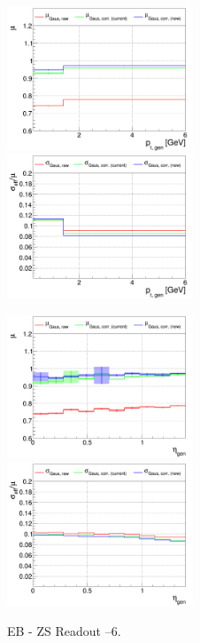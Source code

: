 \begin{figure}
\includegraphics[width=0.495\textwidth]{./plots_pdf/ECAL_plots/plotsNOPU/EB/ZS/pdf/GENPT/EBZS_GENPT_0000_0006_MuOverBins.pdf}
\includegraphics[width=0.495\textwidth]{./plots_pdf/ECAL_plots/plotsNOPU/EB/ZS/pdf/GENPT/EBZS_GENPT_0000_0006_EffSigmaOverBins.pdf}

\includegraphics[width=0.495\textwidth]{./plots_pdf/ECAL_plots/plotsNOPU/EB/ZS/pdf/GENETA/EBZS_GENETA_0000_0006_MuOverBins.pdf}
\includegraphics[width=0.495\textwidth]{./plots_pdf/ECAL_plots/plotsNOPU/EB/ZS/pdf/GENETA/EBZS_GENETA_0000_0006_EffSigmaOverBins.pdf}
\caption[Energy response of PF ECAL cluster for NoPU EB ZS readout senario]{EB - ZS Readout --6\GeV.}
\end{figure}

